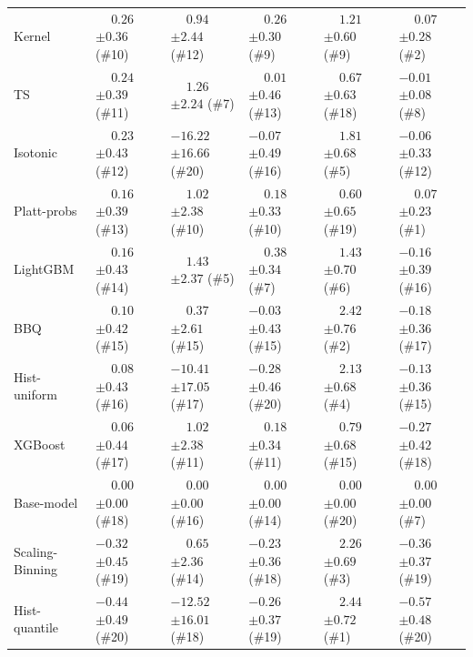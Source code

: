 \begin{tabular}{llllll}
Kernel & $\phantom{-}0.26$ {\tiny $\pm 0.36$} (\#10) & $\phantom{-}0.94$ {\tiny $\pm 2.44$} (\#12) & $\phantom{-}0.26$ {\tiny $\pm 0.30$} (\#9) & $\phantom{-}1.21$ {\tiny $\pm 0.60$} (\#9) & $\phantom{-}0.07$ {\tiny $\pm 0.28$} (\#2) \\
TS & $\phantom{-}0.24$ {\tiny $\pm 0.39$} (\#11) & $\phantom{-}1.26$ {\tiny $\pm 2.24$} (\#7) & $\phantom{-}0.01$ {\tiny $\pm 0.46$} (\#13) & $\phantom{-}0.67$ {\tiny $\pm 0.63$} (\#18) & $-0.01$ {\tiny $\pm 0.08$} (\#8) \\
Isotonic & $\phantom{-}0.23$ {\tiny $\pm 0.43$} (\#12) & $-16.22$ {\tiny $\pm 16.66$} (\#20) & $-0.07$ {\tiny $\pm 0.49$} (\#16) & $\phantom{-}1.81$ {\tiny $\pm 0.68$} (\#5) & $-0.06$ {\tiny $\pm 0.33$} (\#12) \\
Platt-probs & $\phantom{-}0.16$ {\tiny $\pm 0.39$} (\#13) & $\phantom{-}1.02$ {\tiny $\pm 2.38$} (\#10) & $\phantom{-}0.18$ {\tiny $\pm 0.33$} (\#10) & $\phantom{-}0.60$ {\tiny $\pm 0.65$} (\#19) & $\phantom{-}0.07$ {\tiny $\pm 0.23$} (\#1) \\
LightGBM & $\phantom{-}0.16$ {\tiny $\pm 0.43$} (\#14) & $\phantom{-}1.43$ {\tiny $\pm 2.37$} (\#5) & $\phantom{-}0.38$ {\tiny $\pm 0.34$} (\#7) & $\phantom{-}1.43$ {\tiny $\pm 0.70$} (\#6) & $-0.16$ {\tiny $\pm 0.39$} (\#16) \\
BBQ & $\phantom{-}0.10$ {\tiny $\pm 0.42$} (\#15) & $\phantom{-}0.37$ {\tiny $\pm 2.61$} (\#15) & $-0.03$ {\tiny $\pm 0.43$} (\#15) & $\phantom{-}2.42$ {\tiny $\pm 0.76$} (\#2) & $-0.18$ {\tiny $\pm 0.36$} (\#17) \\
Hist-uniform & $\phantom{-}0.08$ {\tiny $\pm 0.43$} (\#16) & $-10.41$ {\tiny $\pm 17.05$} (\#17) & $-0.28$ {\tiny $\pm 0.46$} (\#20) & $\phantom{-}2.13$ {\tiny $\pm 0.68$} (\#4) & $-0.13$ {\tiny $\pm 0.36$} (\#15) \\
XGBoost & $\phantom{-}0.06$ {\tiny $\pm 0.44$} (\#17) & $\phantom{-}1.02$ {\tiny $\pm 2.38$} (\#11) & $\phantom{-}0.18$ {\tiny $\pm 0.34$} (\#11) & $\phantom{-}0.79$ {\tiny $\pm 0.68$} (\#15) & $-0.27$ {\tiny $\pm 0.42$} (\#18) \\
Base-model & $\phantom{-}0.00$ {\tiny $\pm 0.00$} (\#18) & $\phantom{-}0.00$ {\tiny $\pm 0.00$} (\#16) & $\phantom{-}0.00$ {\tiny $\pm 0.00$} (\#14) & $\phantom{-}0.00$ {\tiny $\pm 0.00$} (\#20) & $\phantom{-}0.00$ {\tiny $\pm 0.00$} (\#7) \\
Scaling-Binning & $-0.32$ {\tiny $\pm 0.45$} (\#19) & $\phantom{-}0.65$ {\tiny $\pm 2.36$} (\#14) & $-0.23$ {\tiny $\pm 0.36$} (\#18) & $\phantom{-}2.26$ {\tiny $\pm 0.69$} (\#3) & $-0.36$ {\tiny $\pm 0.37$} (\#19) \\
Hist-quantile & $-0.44$ {\tiny $\pm 0.49$} (\#20) & $-12.52$ {\tiny $\pm 16.01$} (\#18) & $-0.26$ {\tiny $\pm 0.37$} (\#19) & $\phantom{-}2.44$ {\tiny $\pm 0.72$} (\#1) & $-0.57$ {\tiny $\pm 0.48$} (\#20) \\
\bottomrule
\end{tabular}
